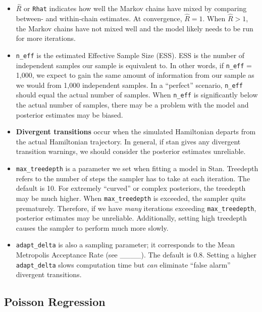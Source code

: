 \documentclass[]{article}
\providecommand{\tightlist}{%
  \setlength{\itemsep}{0pt}\setlength{\parskip}{0pt}}
\begin{document}
\begin{itemize}
\tightlist
\item
  \(\hat{R}\) or \texttt{Rhat} indicates how well the Markov chains have
  mixed by comparing between- and within-chain estimates. At
  convergence, \(\hat{R} = 1\). When \(\hat{R} > 1\), the Markov chains
  have not mixed well and the model likely needs to be run for more
  iterations.\\
\item
  \texttt{n\_eff} is the estimated Effective Sample Size (ESS). ESS is
  the number of independent samples our sample is equivalent to. In
  other words, if \texttt{n\_eff} = 1,000, we expect to gain the same
  amount of information from our sample as we would from 1,000
  independent samples. In a ``perfect'' scenario, \texttt{n\_eff} should
  equal the actual number of samples. When \texttt{n\_eff} is
  significantly below the actual number of samples, there may be a
  problem with the model and posterior estimates may be biased.
\item
  \textbf{Divergent transitions} occur when the simulated Hamiltonian
  departs from the actual Hamiltonian trajectory. In general, if stan
  gives any divergent transition warnings, we should consider the
  posterior estimates unreliable.\\
\item
  \texttt{max\_treedepth} is a parameter we set when fitting a model in
  Stan. Treedepth refers to the number of steps the sampler has to take
  at each iteration. The default is 10. For extremely ``curved'' or
  complex posteriors, the treedepth may be much higher. When
  \texttt{max\_treedepth} is exceeded, the sampler quits prematurely.
  Therefore, if we have \emph{many} iterations exceeding
  \texttt{max\_treedepth}, posterior estimates may be unreliable.
  Additionally, setting high treedepth causes the sampler to perform
  much more slowly.
\item
  \texttt{adapt\_delta} is also a sampling parameter; it corresponds to
  the Mean Metropolis Acceptance Rate (see \_\_\_\_). The default is
  0.8. Setting a higher \texttt{adapt\_delta} slows computation time but
  \emph{can} eliminate ``false alarm'' divergent transitions.
\end{itemize}

\subsection{Poisson Regression}\label{poisson-regression}
\end{document}
